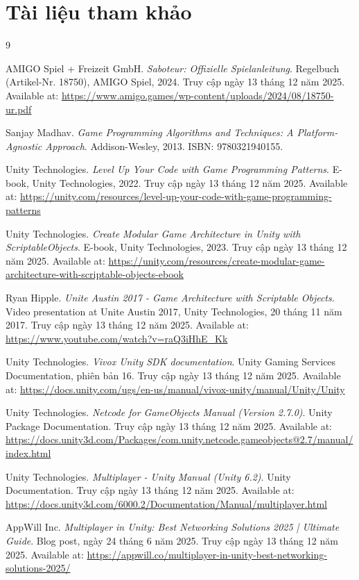 \newpage
\section{Tài liệu tham khảo}
\begin{thebibliography}{9}

AMIGO Spiel + Freizeit GmbH.
\textit{Saboteur: Offizielle Spielanleitung}.
Regelbuch (Artikel-Nr. 18750), AMIGO Spiel, 2024.
Truy cập ngày 13 tháng 12 năm 2025.
Available at: \url{https://www.amigo.games/wp-content/uploads/2024/08/18750-ur.pdf}

Sanjay Madhav.
\textit{Game Programming Algorithms and Techniques: A Platform-Agnostic Approach}.
Addison-Wesley, 2013.
ISBN: 9780321940155.

Unity Technologies.
\textit{Level Up Your Code with Game Programming Patterns}.
E-book, Unity Technologies, 2022.
Truy cập ngày 13 tháng 12 năm 2025.
Available at: \url{https://unity.com/resources/level-up-your-code-with-game-programming-patterns}

Unity Technologies.
\textit{Create Modular Game Architecture in Unity with ScriptableObjects}.
E-book, Unity Technologies, 2023.
Truy cập ngày 13 tháng 12 năm 2025.
Available at: \url{https://unity.com/resources/create-modular-game-architecture-with-scriptable-objects-ebook}

Ryan Hipple.
\textit{Unite Austin 2017 - Game Architecture with Scriptable Objects}.
Video presentation at Unite Austin 2017, Unity Technologies, 20 tháng 11 năm 2017.
Truy cập ngày 13 tháng 12 năm 2025.
Available at: \url{https://www.youtube.com/watch?v=raQ3iHhE_Kk}

Unity Technologies.
\textit{Vivox Unity SDK documentation}.
Unity Gaming Services Documentation, phiên bản 16.
Truy cập ngày 13 tháng 12 năm 2025.
Available at: \url{https://docs.unity.com/ugs/en-us/manual/vivox-unity/manual/Unity/Unity}

Unity Technologies.
\textit{Netcode for GameObjects Manual (Version 2.7.0)}.
Unity Package Documentation.
Truy cập ngày 13 tháng 12 năm 2025.
Available at: \url{https://docs.unity3d.com/Packages/com.unity.netcode.gameobjects@2.7/manual/index.html}

Unity Technologies.
\textit{Multiplayer - Unity Manual (Unity 6.2)}.
Unity Documentation.
Truy cập ngày 13 tháng 12 năm 2025.
Available at: \url{https://docs.unity3d.com/6000.2/Documentation/Manual/multiplayer.html}

AppWill Inc.
\textit{Multiplayer in Unity: Best Networking Solutions 2025 | Ultimate Guide}.
Blog post, ngày 24 tháng 6 năm 2025.
Truy cập ngày 13 tháng 12 năm 2025.
Available at: \url{https://appwill.co/multiplayer-in-unity-best-networking-solutions-2025/}
\end{thebibliography}